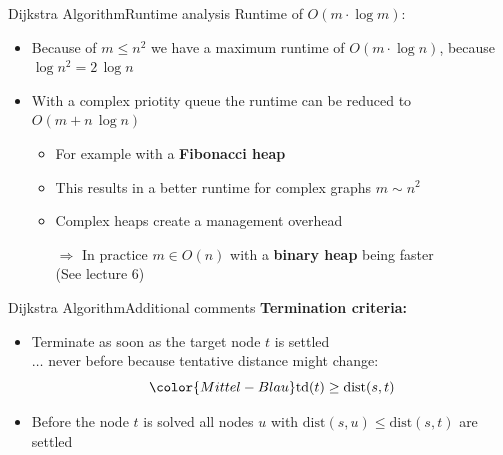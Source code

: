 \begin{frame}{Dijkstra Algorithm}{Runtime analysis}
  Runtime of {\color{Mittel-Blau}$O(m \cdot \log m)$}:
  \begin{itemize}
    \item
      Because of {\color{Mittel-Blau}$m \leq n^2$} we have a maximum runtime of
      {\color{Mittel-Blau}$O(m \cdot \log n)$}, because
      {\color{Mittel-Blau}$\log n^2 = 2 \, \log n$}
    \item
      With a complex {\color{Mittel-Blau}priotity queue} the runtime can be
      reduced to {\color{Mittel-Blau}$O(m + n \, \log n)$}
      \begin{itemize}
        \item
          For example with a \textbf{Fibonacci heap}
        \item
          This results in a better runtime for complex graphs
          {\color{Mittel-Blau}$m \sim n^2$}
        \item
          Complex heaps create a management overhead
        \item[$\Rightarrow$]
          In practice {\color{Mittel-Blau}$m \in O(n)$} with a
          \textbf{binary heap} being faster\\
          {\color{gray}(See lecture 6)}
      \end{itemize}
  \end{itemize}
\end{frame}


\begin{frame}{Dijkstra Algorithm}{Additional comments}
  \textbf{Termination criteria:}
  \begin{itemize}
    \item
      Terminate as soon as the target node {\color{Mittel-Blau}$t$} is settled\\
      $\ldots$ never before because tentative distance might change:
      \begin{displaymath}
        {\color{Mittel-Blau}\mathrm{td}(t) \geq \mathrm{dist}(s, t)}
      \end{displaymath}
    \item
      Before the node {\color{Mittel-Blau}$t$} is solved
      {\color{Mittel-Blau}all nodes $u$} with
      {\color{Mittel-Blau}$\mathrm{dist}(s, u) \leq \mathrm{dist}(s, t)$}
      are settled
  \end{itemize}
\end{frame}

